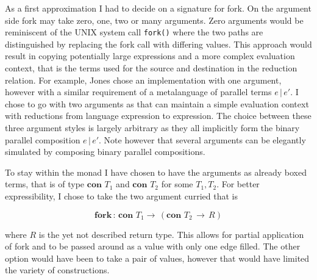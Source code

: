 \documentclass[12pt,twoside,notitlepage]{report}
\begin{document}
As a first approximation I had to decide on a signature for fork. On the argument side fork may take zero, one, two or many arguments. Zero arguments would be reminiscent of the UNIX system call \verb|fork()| where the two paths are distinguished by replacing the fork call with differing values. This approach would result in copying potentially large expressions and a more complex evaluation context, that is the terms used for the source and destination in the reduction relation. For example, Jones\cite{hoareetal2001tackling} chose an implementation with one argument, however with a similar requirement of a metalanguage of parallel terms $ e \, | \, e' $. I chose to go with two arguments as that can maintain a simple evaluation context with reductions from language expression to expression. The choice between these three argument styles is largely arbitrary as they all implicitly form the binary parallel composition $ e \, | \, e' $. Note however that several arguments can be elegantly simulated by composing binary parallel compositions.

To stay within the monad I have chosen to have the arguments as already boxed terms, that is of type $ \textbf{con } T_1 $ and $ \textbf{con } T_2 $ for some $ T_1, T_2 $. For better expressibility, I chose to take the two argument curried that is

\[ \textbf{fork} \, : \, \textbf{con } T_1 \rightarrow \, (\textbf{con } T_2\, \rightarrow\, R ) \]  

where $ R $ is the yet not described return type. This allows for partial application of fork and to be passed around as a value with only one edge filled. The other option would have been to take a pair of values, however that would have limited the variety of constructions.
\end{document}
